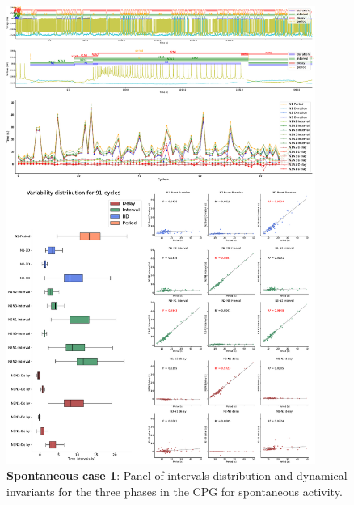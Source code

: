 \begin{figure}[htbp]
	\centering
	\includegraphics[width=0.9\textwidth]{./invariants/data/SUSSEX/prep2/images/3phases/panel_with_intervals.pdf}
	\caption{\textbf{Spontaneous case 1}: Panel of intervals distribution and dynamical invariants for the three phases in the CPG for spontaneous activity.}
	\label{fig:prep2 invariants}
\end{figure}
%


%

